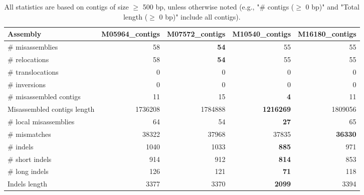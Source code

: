 \documentclass[12pt,a4paper]{article}
\begin{document}
\begin{table}[ht]
\begin{center}
\caption{All statistics are based on contigs of size $\geq$ 500 bp, unless otherwise noted (e.g., "\# contigs ($\geq$ 0 bp)" and "Total length ($\geq$ 0 bp)" include all contigs).}
\begin{tabular}{|l*{4}{|r}|}
\hline
Assembly & M05964\_contigs & M07572\_contigs & M10540\_contigs & M16180\_contigs \\ \hline
\# misassemblies & 58 & {\bf 54} & 55 & 55 \\ \hline
\hspace{5mm}\# relocations & 58 & {\bf 54} & 55 & 55 \\ \hline
\hspace{5mm}\# translocations & 0 & 0 & 0 & 0 \\ \hline
\hspace{5mm}\# inversions & 0 & 0 & 0 & 0 \\ \hline
\# misassembled contigs & 11 & 15 & {\bf 4} & 11 \\ \hline
Misassembled contigs length & 1736208 & 1784888 & {\bf 1216269} & 1809056 \\ \hline
\# local misassemblies & 64 & 54 & {\bf 27} & 65 \\ \hline
\# mismatches & 38322 & 37968 & 37835 & {\bf 36330} \\ \hline
\# indels & 1040 & 1033 & {\bf 885} & 971 \\ \hline
\hspace{5mm}\# short indels & 914 & 912 & {\bf 814} & 853 \\ \hline
\hspace{5mm}\# long indels & 126 & 121 & {\bf 71} & 118 \\ \hline
Indels length & 3377 & 3370 & {\bf 2099} & 3394 \\ \hline
\end{tabular}
\end{center}
\end{table}
\end{document}
